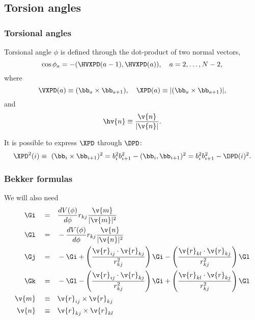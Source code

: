 \subsection{Torsion angles}

\subsubsection{Torsional angles}

Torsional angle $\phi$ is defined through the dot-product of two normal vectors,
\begin{equation}
  \cos\phi_{a}=-(\HVXPD(a-1),\HVXPD(a)),\quad a=2,\ldots,N-2,
\end{equation}
where
\begin{equation}
\VXPD(a)\equiv (\bb_a\times\bb_{a+1}),\quad
\XPD(a)\equiv|(\bb_a\times\bb_{a+1})|,
\end{equation}
and
\begin{equation}
  \hv{n}\equiv \frac{\v{n}}{|\v{n}|}.
\end{equation}

It is possible to express $\XPD$ through $\DPD$:
\begin{equation}
  \XPD^2(i)\equiv\ (\bb_i\times\bb_{i+1})^2
  =b_i^2b_{i+1}^2-(\bb_i,\bb_{i+1})^2
  =b_i^2b_{i+1}^2-\DPD(i)^2.
\end{equation}

\subsubsection{Bekker formulas}

We will also need \cite{Bekker95}
\begin{align}
  \label{Bekker-Gi}\Gi\quad=&\quad \frac{dV(\phi)}{d\phi}r_{kj}\frac{\v{m}}{|\v{m}|^2}\\
  \label{Bekker-Gl}\Gl\quad=&\quad-\frac{dV(\phi)}{d\phi}r_{kj}\frac{\v{n}}{|\v{n}|^2}\\
\Gj\quad=&\quad-\Gi +\left(\frac{\v{r}_{ij}\cdot{\v{r}_{kj}}}{r_{kj}^2}\right)\Gi
  -\left(\frac{\v{r}_{kl}\cdot{\v{r}_{kj}}}{r_{kj}^2}\right)\Gl\\
  \label{Bekker-Gk}\Gk\quad=&\quad-\Gl
  -\left(\frac{\v{r}_{ij}\cdot{\v{r}_{kj}}}{r_{kj}^2}\right)\Gi
  +\left(\frac{\v{r}_{kl}\cdot{\v{r}_{kj}}}{r_{kj}^2}\right)\Gl\\
\v{m}\quad\equiv&\quad\v{r}_{ij}\times\v{r}_{kj}\\
\v{n}\quad\equiv&\quad\v{r}_{kj}\times\v{r}_{kl}
\end{align}

